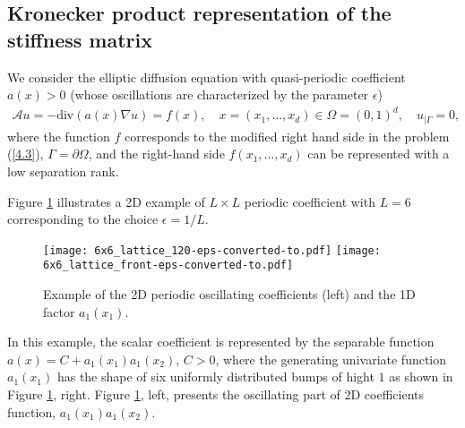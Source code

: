 \documentclass[amstex,amstext,amsfonts,epsf,12pt] {amsart}
\newcommand{\cn}{\color{black}}
\newcommand\ben{\begin{eqnarray}}
\newcommand\een{\end{eqnarray}}
\def\ben{\begin{eqnarray}}
\def\een{\end{eqnarray}}
\begin{document}
\subsection{Kronecker product representation of the stiffness matrix}\label{ssec:Kron_matr}


We consider the elliptic diffusion equation  with
quasi-periodic coefficient $a(x)>0$ (whose oscillations are characterized 
by the parameter $\epsilon$) %
\ben \label{eqn:5.1}
{\mathcal A}u  =-\mbox{div} (a(x) \nabla u) =f(x), 
\quad x=(x_1,\ldots,x_d)\in \Omega=(0,1)^d,\quad {u}_{|\Gamma}=0,
\een
where the function $f$ corresponds to the modified right hand side in the problem (\ref{4.3}),
$\Gamma=\partial \Omega$, and the right-hand side $f(x_1,\ldots,x_d)$ 
can be represented with a low separation rank.


Figure \ref{fig:Hom2d_Exm1} illustrates a 2D example of $L \times L$ periodic
coefficient with $L=6$ corresponding to the choice $\epsilon=1/L$. 
\begin{figure}[htbp]
\centering
\texttt{[image: 6x6\_lattice\_120-eps-converted-to.pdf]}
\texttt{[image: 6x6\_lattice\_front-eps-converted-to.pdf]}
\caption{\small Example of the 2D periodic oscillating coefficients (left) 
and the 1D factor $a_1(x_1)$.}
\label{fig:Hom2d_Exm1}  
\end{figure}
In this example, the scalar coefficient 
is represented by the separable function $a(x)=C+ a_1(x_1) a_1(x_2)$, $C>0$,
where the generating univariate function $a_1(x_1)$ has the shape of six uniformly 
distributed bumps of hight $1$ as shown in Figure \ref{fig:Hom2d_Exm1}, right.
Figure \ref{fig:Hom2d_Exm1}, left, presents the oscillating part of 2D coefficients 
function, $a_1(x_1) a_1(x_2)$.
\end{document}
